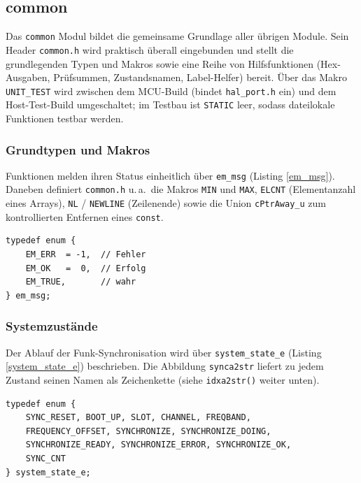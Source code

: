 \subsection{common}\label{common}
Das \verb|common| Modul bildet die gemeinsame Grundlage aller übrigen
Module. Sein Header \verb|common.h| wird praktisch überall eingebunden und
stellt die grundlegenden Typen und Makros sowie eine Reihe von
Hilfsfunktionen (Hex-Ausgaben, Prüfsummen, Zustandsnamen, Label-Helfer)
bereit. Über das Makro \verb|UNIT_TEST| wird zwischen dem MCU-Build (bindet
\verb|hal_port.h| ein) und dem Host-Test-Build umgeschaltet; im Testbau ist
\verb|STATIC| leer, sodass dateilokale Funktionen testbar werden.

\subsubsection*{Grundtypen und Makros}
Funktionen melden ihren Status einheitlich über \verb|em_msg|
(Listing \ref{em_msg}). Daneben definiert \verb|common.h| u.\,a.\ die Makros
\verb|MIN| und \verb|MAX|, \verb|ELCNT| (Elementanzahl eines Arrays),
\verb|NL| / \verb|NEWLINE| (Zeilenende) sowie die Union \verb|cPtrAway_u|
zum kontrollierten Entfernen eines \verb|const|.

\begin{listing}
\begin{verbatim}
typedef enum {
    EM_ERR  = -1,  // Fehler
    EM_OK   =  0,  // Erfolg
    EM_TRUE,       // wahr
} em_msg;
\end{verbatim}
\caption{Einheitlicher Rückgabetyp \texttt{em\_msg}}
\label{em_msg}
\end{listing}

\subsubsection*{Systemzustände}
Der Ablauf der Funk-Synchronisation wird über \verb|system_state_e|
(Listing \ref{system_state_e}) beschrieben. Die Abbildung \verb|synca2str|
liefert zu jedem Zustand seinen Namen als Zeichenkette (siehe
\verb|idxa2str()| weiter unten).

\begin{listing}
\begin{verbatim}
typedef enum {
    SYNC_RESET, BOOT_UP, SLOT, CHANNEL, FREQBAND,
    FREQUENCY_OFFSET, SYNCHRONIZE, SYNCHRONIZE_DOING,
    SYNCHRONIZE_READY, SYNCHRONIZE_ERROR, SYNCHRONIZE_OK,
    SYNC_CNT
} system_state_e;
\end{verbatim}
\caption{Synchronisations-Zustände \texttt{system\_state\_e}}
\label{system_state_e}
\end{listing}

